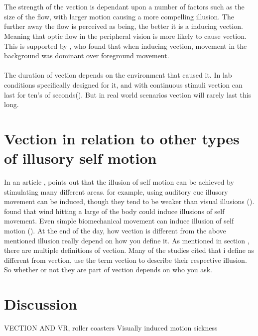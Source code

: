 \documentclass[11pt,a4paper,oneside,table,xcdraw]{article}
\begin{document}
\\\\
The strength of the vection is dependant upon a number of factors such as the size of the flow, with larger motion causing a more compelling illusion. The further away the flow is perceived as being, the better it is a inducing vection. Meaning that optic flow in the peripheral vision is more likely to cause vection. This is supported by \cite{vection}, who found that when inducing vection, movement in the background was dominant over foreground movement.\\\\
The duration of vection depends on the environment that caused it. In lab conditions specifically designed for it, and with continuous stimuli vection can last for ten's of seconds(\cite{vection}). But in real world scenarios vection will rarely last this long.  
\section{Vection in relation to other types of illusory self motion}
In an article \cite{challenges}, points out that the illusion of self motion can be achieved by stimulating many different areas. for example, using auditory cue illusory movement can be induced, though they tend to be weaker than visual illusions (\cite{auditory, movement}). \cite{wind} found that wind hitting a large of the body could induce illusions of self movement. Even simple biomechanical movement can induce illusion of self motion (\cite{movement,challenges}). At the end of the day, how vection is different from the above mentioned illusion really depend on how you define it. As mentioned in section , there are multiple definitions of vection. Many of the studies cited that i define as different from vection, use the term vection to describe their respective illusion. So whether or not they are part of vection depends on who you ask. 
\section{Discussion}
VECTION AND VR, roller coasters
Visually induced motion sickness



\end{document}

